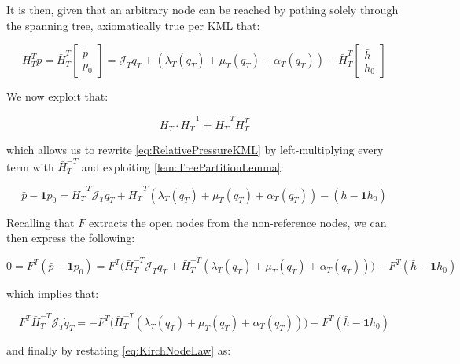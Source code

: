 It is then, given that an arbitrary node can be reached by pathing solely through the spanning tree, axiomatically true per KML that:

\begin{equation}\label{eq:RelativePressureKML}
	H_T^T p = 
	\bar{H}_T^T \begin{bmatrix} \bar{p} \\ p_0	\end{bmatrix} =
	\mathcal{J}_T\dot{q}_T + (\lambda_T(q_T)+\mu_T(q_T) + \alpha_T(q_T)) - 
	\bar{H}_T^T \begin{bmatrix} \bar{h} \\ h_0	\end{bmatrix}
\end{equation}

We now exploit that:

\begin{equation}\label{eq:TreeLemmaRewrite}
	H_T\cdot\bar{H}_T^{-1} = \bar{H}_T^{-T}H_T^T 
\end{equation}

which allows us to rewrite \cref{eq:RelativePressureKML} by left-multiplying every term with $\bar{H}_T^{-T}$ and exploiting \cref{lem:TreePartitionLemma}:

\begin{equation}\label{eq:RelativePressureKMLWithLemma}
	\bar{p} - \mathbf{1}p_0 =
	\bar{H}_T^{-T}\mathcal{J}_T\dot{q}_T + \bar{H}_T^{-T}(\lambda_T(q_T)+\mu_T(q_T) + \alpha_T(q_T)) - 
	(\bar{h} - \mathbf{1}h_0)
\end{equation}

Recalling that $F$ extracts the open nodes from the non-reference nodes, we can then express the following:

\begin{equation}\label{eq:RelativePressureLemmaAtmospheric}
	0 = F^T(\bar{p} - \mathbf{1}p_0) =
	F^T\Big(\bar{H}_T^{-T}\mathcal{J}_T\dot{q}_T + \bar{H}_T^{-T}(\lambda_T(q_T)+\mu_T(q_T) + \alpha_T(q_T))\Big) - 
	F^T(\bar{h} - \mathbf{1}h_0)
\end{equation}

which implies that: 

\begin{equation}\label{eq:RelativePressureLemmaDiffEqForm}
	F^T\bar{H}_T^{-T}\mathcal{J}_T\dot{q}_T = - F^T\Big(\bar{H}_T^{-T}(\lambda_T(q_T)+\mu_T(q_T) + \alpha_T(q_T))\Big) + 
	F^T(\bar{h} - \mathbf{1}h_0)
\end{equation}

and finally by restating \cref{eq:KirchNodeLaw} as:

